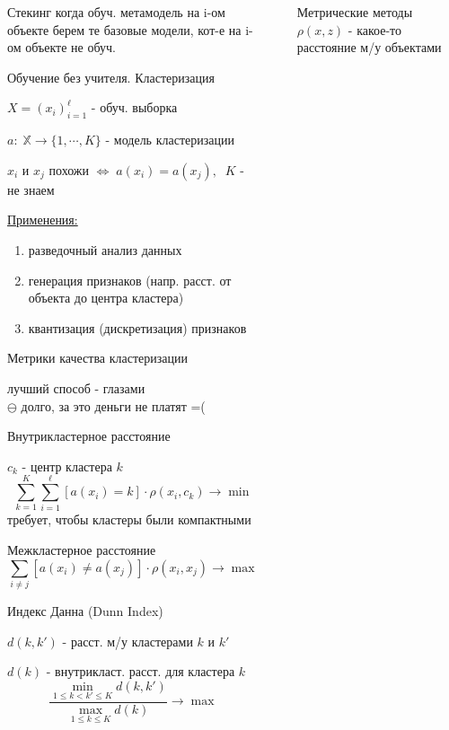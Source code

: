 \documentclass[final]{beamer}
\newlength{\sepwidth}
\newlength{\colwidth}
\newcommand{\separatorcolumn}{\begin{column}{\sepwidth}\end{column}}
\begin{document}
\begin{frame}[t]
\begin{columns}[t]
\begin{column}{\colwidth}
\begin{block}{Стекинг}
{\small когда обуч. метамодель на i-ом объекте берем те базовые модели, кот-е на i-ом объекте не обуч.}
\end{block}
\begin{block}{Обучение без учителя. Кластеризация}

$X = (x_i)_{i = 1}^{\ell}$ - {\small обуч. выборка}

$a : \; \mathbb{X} \to \{1, \cdots, K\}$ - {\small модель кластеризации}

$x_i$ {\small и } $x_j$ {\small похожи } $\Leftrightarrow \; a(x_i) = a(x_j), \; \; K$ - {\small не знаем}

\underline{\small Применения:}
\begin{enumerate}
    \item {\small разведочный анализ данных}
    \item {\small генерация признаков (напр. расст. от объекта до центра кластера)}
    \item {\small квантизация (дискретизация) признаков}
\end{enumerate}
\end{block}
\begin{block}{Метрики качества кластеризации}

{\small лучший способ - глазами}\\
$\ominus$ {\small долго, за это деньги не платят =(}\\
\hrulefill

{\small Внутрикластерное расстояние}

$c_k$ - {\small центр кластера } $k$
\[\sum\limits_{k = 1}^K \sum\limits_{i = 1}^{\ell} [a(x_i) = k] \cdot \rho(x_i, c_k) \to \min \]
{\small требует, чтобы кластеры были компактными}\\
\hrulefill

{\small Межкластерное расстояние}
\[\sum\limits_{i \ne j} [a(x_i) \ne a(x_j)] \cdot \rho(x_i, x_j) \to \max\]
\hrulefill

{\small Индекс Данна (Dunn Index)}

$d(k, k')$ - {\small расст. м/у кластерами } $k$ {\small и } $k'$

$d(k)$ - {\small внутрикласт. расст. для кластера } $k$
\[\frac{\min\limits_{1 \le k < k' \le K} d(k, k')}{\max\limits_{1 \le k \le K} d(k)} \to \max \]
\end{block}
\end{column}
\separatorcolumn
\begin{column}{\colwidth}
\begin{block}{Метрические методы}
$\rho(x, z)$ - {\small какое-то расстояние м/у объектами}\\
\hrulefill


\end{block}
\end{column}
\end{columns}
\end{frame}
\end{document}
